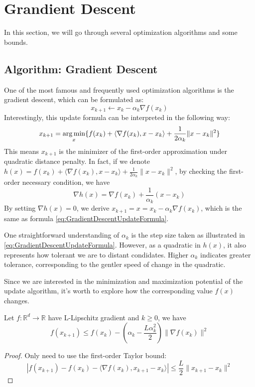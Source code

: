 \chapter{Grandient Descent}

In this section, we will go through several optimization algorithms and some bounds.

\section{Algorithm: Gradient Descent}
One of the most famous and frequently used optimization algorithms is the gradient descent, which can be formulated as:
\begin{equation}\label{eq:GradientDescentUpdateFormula}
    x_{k+1} \leftarrow x_k - \alpha_k\nabla f(x_k)
\end{equation}
Interestingly, this update formula can be interpreted in the following way:
\begin{equation*}
    x_{k+1} = \operatorname*{arg\,min}_x \{ f(x_k) + \langle \nabla f(x_k), x-x_k \rangle + \frac{1}{2\alpha_k}\|x-x_k\|^2 \}
\end{equation*}
This means $x_{k+1}$ is the minimizer of the first-order approximation under quadratic distance penalty. In fact, if we denote $h(x) = f(x_k) + \langle \nabla f(x_k), x-x_k \rangle + \frac{1}{2\alpha_k}\|x-x_k\|^2$, by checking the first-order necessary condition, we have 
\begin{equation*}
    \nabla h(x) = \nabla f(x_k) + \frac{1}{\alpha_k}(x - x_k)
\end{equation*}
By setting $\nabla h(x) = 0$, we derive $x_{k+1} = x = x_k - \alpha_k\nabla f(x_k)$, which is the same as formula \ref{eq:GradientDescentUpdateFormula}.

\begin{note}
    One straightforward understanding of $\alpha_k$ is the step size taken as illustrated in \ref{eq:GradientDescentUpdateFormula}. However, as a quadratic in $h(x)$, it also represents how tolerant we are to distant condidates. Higher $\alpha_k$ indicates greater tolerance, corresponding to the gentler speed of change in the quadratic. 
\end{note}

Since we are interested in the minimization and maximization potential of the update algorithm, it's worth to explore how the corresponding value $f(x)$ changes. 
\begin{lemma}\label{lemma:DescentLemma}
    Let $f: \mathbb{R}^d \rightarrow \mathbb{R}$ have L-Lipschitz gradient and $k \geq 0$, we have
    \begin{equation*}
        f(x_{k+1}) \leq f(x_k) - (\alpha_k - \frac{L\alpha_k^2}{2}) \| \nabla f(x_k) \|^2
    \end{equation*}
\end{lemma}
\begin{proof}
    Only need to use the first-order Taylor bound:
    \begin{equation*}
        | f(x_{k+1}) - f(x_k) - \langle \nabla f(x_k), x_{k+1} - x_k \rangle | \leq \frac{L}{2}\|x_{k+1} - x_k\|^2
    \end{equation*}
\end{proof}

